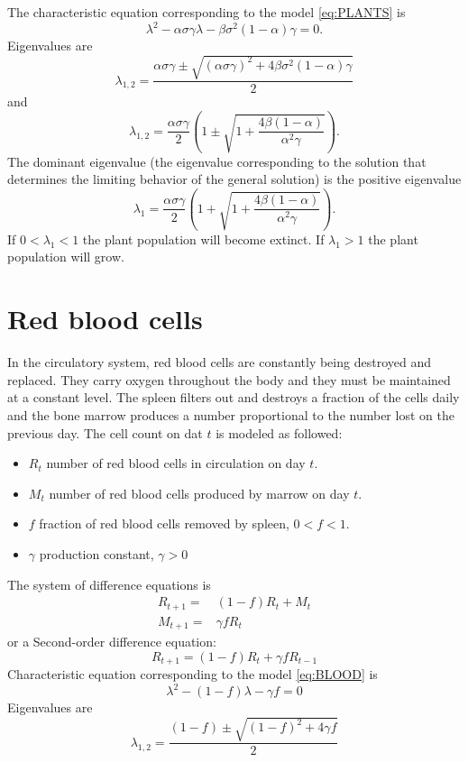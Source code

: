 The characteristic equation corresponding to the model \eqref{eq:PLANTS} is
$$\lambda ^2 - \alpha \sigma \gamma \lambda - \beta \sigma^2 (1-\alpha) \gamma=0.$$
Eigenvalues are
$$\lambda _{1,2}=\frac{\alpha \sigma \gamma \pm \sqrt{(\alpha \sigma \gamma)^2+4\beta \sigma^2 (1-\alpha) \gamma}}{2}$$
and
$$\lambda _{1,2}=\frac{\alpha \sigma \gamma }{2}\left (1\pm \sqrt{1+\frac{4\beta  (1-\alpha)}{\alpha^2 \gamma }}\right ).$$
The dominant eigenvalue (the eigenvalue corresponding to the solution that determines the limiting behavior of the general solution) is the positive eigenvalue
$$\lambda _{1}=\frac{\alpha \sigma \gamma }{2}\left (1+ \sqrt{1+\frac{4\beta  (1-\alpha)}{\alpha^2 \gamma }}\right ).$$
If $0<\lambda _1 <1$ the plant population will become extinct.
If $\lambda _1 >1$ the plant population will grow.






\section{Red blood cells}
In the circulatory system, red blood cells are constantly being destroyed and replaced. They carry oxygen throughout the body and they must be maintained at a constant level. The spleen filters out and destroys a fraction of the cells daily and the bone marrow produces a number proportional to the number lost on the previous day. The cell count on dat $t$ is modeled as followed:
\begin{itemize}
\item $R_t$ number of red blood cells in circulation on day $t$.
\item $M_t$ number of red blood cells produced by marrow on day $t$.
\item $f$ fraction of red blood cells removed by spleen, $0<f<1$.
\item $\gamma$ production constant, $\gamma >0$
\end{itemize}
The system of difference equations is
\begin{subequations}\label{eq:reblood}
\begin{align}
R_{t+1}=&(1-f)R_t+M_t\label{eq:reblood1}\\
M_{t+1}=&\gamma f R_t \label{eq:reblood2}
\end{align}   
\end{subequations} 
or a Second-order difference equation:
\begin{equation}\label{eq:BLOOD}
R_{t+1}=(1-f)R_t+\gamma f R_{t-1}
\end{equation}
Characteristic equation corresponding to the model \eqref{eq:BLOOD} is
$$\lambda ^2 - (1-f) \lambda -  \gamma f=0$$
Eigenvalues are
$$\lambda_{1,2}=\frac{(1-f)\pm \sqrt{(1-f)^2 + 4 \gamma f}}{2}$$

